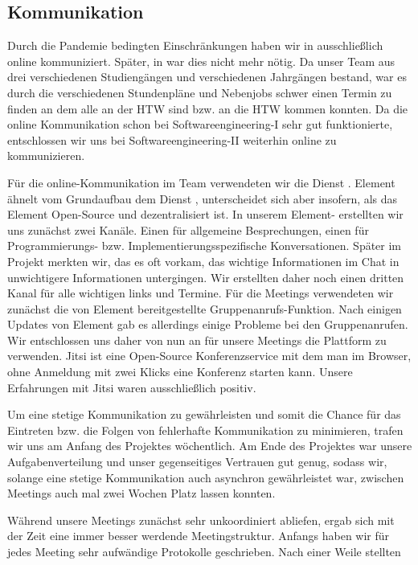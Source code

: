 \documentclass{article}
\begin{document}
\subsection{Kommunikation}
Durch die Pandemie bedingten Einschränkungen haben wir in  ausschließlich online kommuniziert. Später, in  war dies nicht mehr nötig. Da unser Team aus drei verschiedenen
Studiengängen und verschiedenen Jahrgängen bestand, war es durch die verschiedenen Stundenpläne und Nebenjobs 
schwer einen Termin zu finden an dem alle an der HTW sind bzw. an die HTW kommen konnten. Da die online Kommunikation 
schon bei Softwareengineering-I sehr gut funktionierte, entschlossen wir uns bei Softwareengineering-II weiterhin online 
zu kommunizieren.\par
\medskip
Für die online-Kommunikation im Team verwendeten wir die Dienst . Element ähnelt vom Grundaufbau dem 
Dienst , unterscheidet sich aber insofern, als das Element Open-Source und dezentralisiert ist.
In unserem Element- erstellten wir uns zunächst zwei Kanäle. Einen für allgemeine Besprechungen, 
einen für  Programmierungs- bzw. Implementierungsspezifische Konversationen. Später im Projekt merkten wir, das 
es oft vorkam, das wichtige Informationen im Chat in unwichtigere Informationen untergingen. Wir erstellten
daher noch einen dritten Kanal für alle wichtigen links und Termine.
Für die Meetings verwendeten wir zunächst die von Element bereitgestellte Gruppenanrufs-Funktion.
Nach einigen Updates von Element gab es allerdings einige Probleme bei den Gruppenanrufen. Wir entschlossen 
uns daher von nun an für unsere Meetings die Plattform  zu verwenden.
Jitsi ist eine Open-Source Konferenzservice mit dem man im Browser, 
ohne Anmeldung mit zwei Klicks eine Konferenz starten kann. Unsere Erfahrungen mit Jitsi waren ausschließlich positiv.\par
\medskip
Um eine stetige Kommunikation zu gewährleisten und somit die Chance für das Eintreten bzw. die Folgen
von fehlerhafte Kommunikation zu minimieren, trafen wir uns am Anfang des Projektes wöchentlich. Am Ende 
des Projektes war unsere Aufgabenverteilung und unser gegenseitiges Vertrauen gut genug, sodass wir, solange
eine stetige Kommunikation auch asynchron gewährleistet war, zwischen Meetings auch mal zwei Wochen Platz lassen konnten.\par
\medskip
Während unsere Meetings zunächst sehr unkoordiniert abliefen, ergab sich mit der Zeit eine immer besser werdende 
Meetingstruktur. Anfangs haben wir für jedes Meeting sehr aufwändige Protokolle geschrieben. Nach einer Weile stellten 
\end{document}
